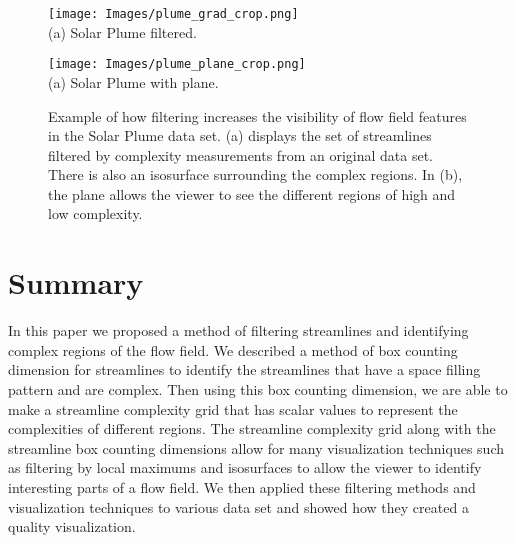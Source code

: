 \documentclass{egpubl}
\begin{document}
\begin{figure}[h]
        \centering
               	\begin{minipage}{0.47\linewidth}
                      	\centering \small
                        \texttt{[image: Images/plume\_grad\_crop.png]}\\(a) Solar Plume filtered.
                \end{minipage}
                \begin{minipage}{0.47\linewidth}
                        \centering \small
                        \texttt{[image: Images/plume\_plane\_crop.png]}\\(a) Solar Plume with plane.
                \end{minipage}
        \caption{Example of how filtering increases the visibility of flow field features in the Solar Plume data set. (a) displays the set of streamlines filtered by complexity measurements from an original data set. There is also an isosurface surrounding the complex regions. In (b), the plane allows the viewer to see the different regions of high and low complexity.}
        \label{fig:plume_lines}
\end{figure}

\section{Summary}

In this paper we proposed a method of filtering streamlines and identifying complex regions of the flow field.
We described a method of box counting dimension for streamlines to identify the streamlines that have a space filling pattern and are complex.
Then using this box counting dimension, we are able to make a streamline complexity grid that has scalar values to represent the complexities of different regions.
The streamline complexity grid along with the streamline box counting dimensions allow for many visualization techniques such as filtering by local maximums and isosurfaces to allow the viewer to identify interesting parts of a flow field.
We then applied these filtering methods and visualization techniques to various data set and showed how they created a quality visualization.


\clearpage
%


\end{document}
